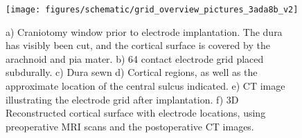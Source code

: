 \begin{figure}[ht]
	\centering
	\texttt{[image: figures/schematic/grid\_overview\_pictures\_3ada8b\_v2]}
	\caption[Subject implanation, cortical reconstruction, and electrode registration]{a) Craniotomy window prior to electrode implantation. The dura has visibly been cut, and the cortical surface is covered by the arachnoid and pia mater. b) 64 contact electrode grid placed subdurally. c) Dura sewn d) Cortical regions, as well as the approximate location of the central sulcus indicated. e) CT image illustrating the electrode grid after implantation. f) 3D Reconstructed cortical surface with electrode locations, using preoperative MRI scans and the postoperative CT images.}
	\label{fig:gmBrainSchematic}
\end{figure}